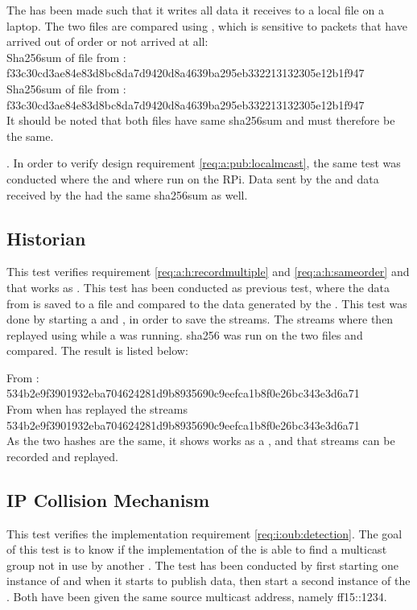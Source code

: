 \noindent The \con{} has been made such that it writes all data it receives to a local file on a laptop. 
The two files are compared using , which is sensitive to packets that have arrived out of order or not arrived at all: \\
\noindent{}Sha256sum of file from \pub{}:\\
f33c30cd3ae84e83d8bc8da7d9420d8a4639ba295eb332213132305e12b1f947 \\
\noindent{}Sha256sum of file from \sub{}:\\
f33c30cd3ae84e83d8bc8da7d9420d8a4639ba295eb332213132305e12b1f947  \\

\noindent{}It should be noted that both files have same sha256sum and must therefore be the same.

\noindent{}. In order to verify design requirement \ref{req:a:pub:localmcast}, the same test was conducted where the \pub{} and \sub{} where run on the RPi. Data sent by the \pub{} and data received by the \sub{} had the same sha256sum as well.

\subsection{Historian}
This test verifies requirement \ref{req:a:h:recordmultiple} and \ref{req:a:h:sameorder} and that  works as \hist{}. This test has been conducted as previous test, where the data from  is saved to a file and compared to the data generated by the \con{}. This test was done by starting a \pub{} and , in order to save the streams. The streams where then replayed using  while a \sub{} was running. sha256 was run on the two files and compared. The result is listed below:

\noindent{}From \pub{}: \\
534b2e9f3901932eba704624281d9b8935690c9eefca1b8f0e26bc343e3d6a71\\
\noindent{}From \con{} when  has replayed the streams\\
534b2e9f3901932eba704624281d9b8935690c9eefca1b8f0e26bc343e3d6a71\\

\noindent{}As the two hashes are the same, it shows  works as a \hist{}, and that streams can be recorded and replayed.


\subsection{IP Collision Mechanism} 
This test verifies the implementation requirement \ref{req:i:oub:detection}. The goal of this test is to know if the implementation of the \pub{} is able to find a multicast group not in use by another \pub{}.
The test has been conducted by first starting one instance of  and when it starts to publish data, then start a second instance of the . Both  have been given the same source multicast address, namely ff15::1234.

